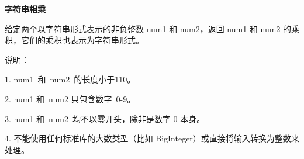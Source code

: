 \textbf{字符串相乘}\par

给定两个以字符串形式表示的非负整数 num1 和 num2，返回 num1 和 num2 的乘积，它们的乘积也表示为字符串形式。\par

说明：\par

1. num1 和 num2 的长度小于110。\par
2. num1 和 num2 只包含数字 0-9。\par
3. num1 和 num2 均不以零开头，除非是数字 0 本身。\par
4. 不能使用任何标准库的大数类型（比如 BigInteger）或直接将输入转换为整数来处理。\par


